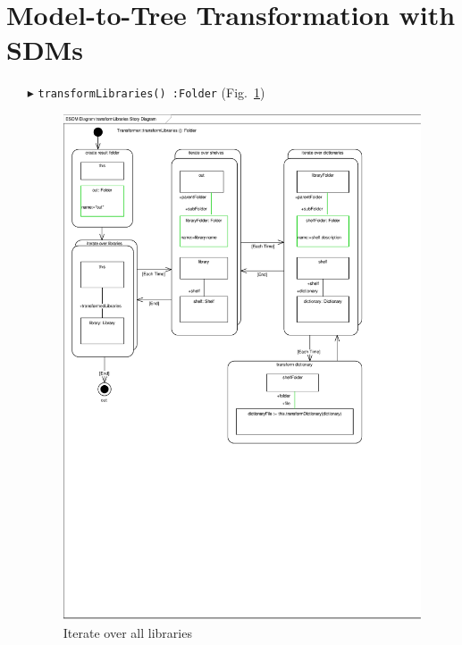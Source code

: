 \section{Model-to-Tree Transformation with SDMs}


\begin{enumerate}
    
\item[$\blacktriangleright$] \texttt{transformLibraries()~:Folder}
  (Fig.~\ref{fig:moca-transformLibraries})    
\begin{figure}[!htbp]
\begin{center}
 \includegraphics[width=\textwidth]{pics/moca/4ModelToMocaTree/transformLibraries}
  \caption{Iterate over all libraries} 
  \label{fig:moca-transformLibraries}
\end{center}
\end{figure}


\end{enumerate}
